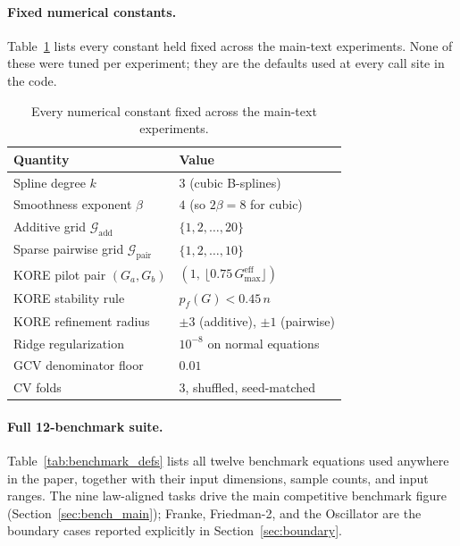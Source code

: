 \documentclass{article}
\newcommand{\KORE}{\textsc{KORE}}
\newcommand{\add}{\mathrm{add}}
\newcommand{\pair}{\mathrm{pair}}
\begin{document}
\paragraph{Fixed numerical constants.}
Table~\ref{tab:fixed_constants} lists every constant held fixed across the main-text experiments. None of these were tuned per experiment; they are the defaults used at every call site in the code.

\begin{table}[h]
\caption{Every numerical constant fixed across the main-text experiments.}
\label{tab:fixed_constants}
\centering
\small
\begin{tabular}{@{}ll@{}}
\toprule
Quantity & Value \\
\midrule
Spline degree $k$ & $3$ (cubic B-splines) \\
Smoothness exponent $\beta$ & $4$ (so $2\beta = 8$ for cubic) \\
Additive grid $\mathcal{G}_{\add}$ & $\{1,2,\dots,20\}$ \\
Sparse pairwise grid $\mathcal{G}_{\pair}$ & $\{1,2,\dots,10\}$ \\
\KORE{} pilot pair $(G_a,G_b)$ & $(1,\ \lfloor 0.75\,G_{\max}^{\text{eff}}\rfloor)$ \\
\KORE{} stability rule & $p_f(G) < 0.45\,n$ \\
\KORE{} refinement radius & $\pm 3$ (additive), $\pm 1$ (pairwise) \\
Ridge regularization & $10^{-8}$ on normal equations \\
GCV denominator floor & $0.01$ \\
CV folds & $3$, shuffled, seed-matched \\
\bottomrule
\end{tabular}
\end{table}

\paragraph{Full 12-benchmark suite.}
Table~\ref{tab:benchmark_defs} lists all twelve benchmark equations used anywhere in the paper, together with their input dimensions, sample counts, and input ranges. The nine law-aligned tasks drive the main competitive benchmark figure (Section~\ref{sec:bench_main}); Franke, Friedman-2, and the Oscillator are the boundary cases reported explicitly in Section~\ref{sec:boundary}.
\end{document}
